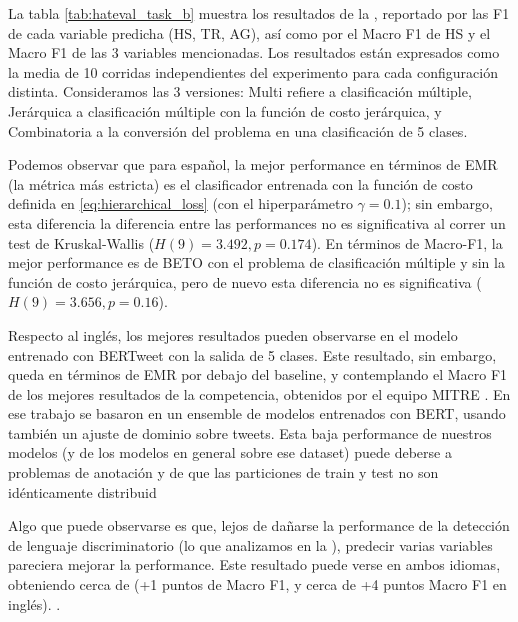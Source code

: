 La tabla \ref{tab:hateval_task_b} muestra los resultados de la \subtaskb{}, reportado por las F1 de cada variable predicha (HS, TR, AG), así como por el Macro F1 de HS y el Macro F1 de las 3 variables mencionadas. Los resultados están expresados como la media de 10 corridas independientes del experimento para cada configuración distinta. Consideramos las 3 versiones: Multi refiere a clasificación múltiple, Jerárquica a clasificación múltiple con la función de costo jerárquica, y Combinatoria a la conversión del problema en una clasificación de 5 clases.

Podemos observar que para español, la mejor performance en términos de EMR (la métrica más estricta) es el clasificador entrenada con la función de costo definida en \ref{eq:hierarchical_loss} (con el hiperparámetro $\gamma = 0.1$); sin embargo, esta diferencia la diferencia entre las performances no es significativa al correr un test de Kruskal-Wallis ($H(9) = 3.492, p = 0.174$). En términos de Macro-F1, la mejor performance es de BETO con el problema de clasificación múltiple y sin la función de costo jerárquica, pero de nuevo esta diferencia no es significativa ($H(9) = 3.656, p=0.16$).

Respecto al inglés, los mejores resultados pueden observarse en el modelo entrenado con BERTweet con la salida de 5 clases. Este resultado, sin embargo, queda en términos de EMR por debajo del baseline, y contemplando el Macro F1 de los mejores resultados de la competencia, obtenidos por el equipo MITRE \cite{gertner-etal-2019-mitre}. En ese trabajo se basaron en un ensemble de modelos entrenados con BERT, usando también un ajuste de dominio sobre tweets. Esta baja performance de nuestros modelos (y de los modelos en general sobre ese dataset) puede deberse a problemas de anotación y de que las particiones de train y test no son idénticamente distribuid

Algo que puede observarse es que, lejos de dañarse la performance de la detección de lenguaje discriminatorio (lo que analizamos en la \subtaska{}), predecir varias variables pareciera mejorar la performance. Este resultado puede verse en ambos idiomas, obteniendo cerca de (+1 puntos de Macro F1, y cerca de +4 puntos Macro F1 en inglés). .



